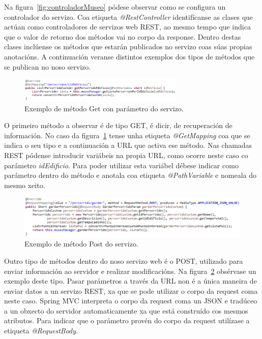 Na figura~\ref{fig:controladorMuseo} pódese observar como se configura un controlador do servizo. Coa etiqueta \emph{@RestController} identifícanse as clases que actúan como controladores de servizos web REST, ao mesmo tempo que indica que o valor de retorno dos métodos vai no corpo da response. Dentro destas clases inclúense os métodos que estarán publicados no servizo coas súas propias anotacións. A continuación veranse distintos exemplos dos tipos de métodos que se publican no noso servizo.

\begin{figure}[tbh] 
	\begin{center}
		\includegraphics[width=0.7\textwidth]{figures/codigo/chamadaServizoGetParametro}
		\caption{Exemplo de método Get con parámetro do servizo.}
		\label{fig:chamadaServizoGetParametro}
	\end{center}
\end{figure}

O primeiro método a observar é de tipo GET, é dicir, de recuperación de información. No caso da figura~\ref{fig:chamadaServizoGetParametro} tense unha etiqueta \emph{@GetMapping} coa que se indica o seu tipo e a continuación a URL que activa ese método. Nas chamadas REST pódense introducir variábeis na propia URL, como ocorre neste caso co parámetro \emph{idEdificio}. Para poder utilizar esta variábel débese indicar como parámetro dentro do método e anotala coa etiqueta \emph{@PathVariable} e nomeala do mesmo xeito.

\begin{figure}[tbh] 
	\begin{center}
		\includegraphics[width=1\textwidth]{figures/codigo/chamadaServizoPost}
		\caption{Exemplo de método Post do servizo.}
		\label{fig:chamadaServizoPost}
	\end{center}
\end{figure}

Outro tipo de métodos dentro do noso servizo web é o POST, utilizado para enviar información ao servidor e realizar modificacións. Na figura~\ref{fig:chamadaServizoPost} obsérvase un exemplo deste tipo. Pasar parámetros a través da URL non é a única maneira de enviar datos a un servizo REST, xa que se pode utilizar o corpo da request coma neste caso. Spring MVC interpreta o corpo da request coma un JSON e tradúceo a un obxecto do servidor automaticamente xa que está construído cos mesmos atributos. Para indicar que o parámetro provén do corpo da request utilízase a etiqueta \emph{@RequestBody}.


